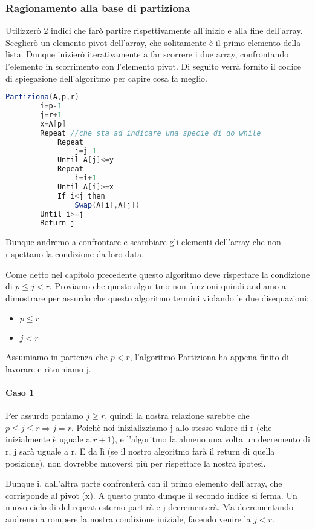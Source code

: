 \subsubsection{Ragionamento alla base di partiziona}
Utilizzerò 2 indici che farò partire rispettivamente all'inizio e alla fine dell'array. Sceglierò un elemento pivot dell'array, che solitamente è il primo elemento della lista. Dunque inizierò iterativamente a far scorrere i due array, confrontando l'elemento in scorrimento con l'elemento pivot. Di seguito verrà fornito il codice di spiegazione dell'algoritmo per capire cosa fa meglio.

\begin{lstlisting}[language=java]
    Partiziona(A,p,r)
        i=p-1
        j=r+1
        x=A[p]
        Repeat //che sta ad indicare una specie di do while
            Repeat
                j=j-1
            Until A[j]<=y
            Repeat
                i=i+1
            Until A[i]>=x
            If i<j then
                Swap(A[i],A[j])
        Until i>=j
        Return j
\end{lstlisting}

Dunque andremo a confrontare e scambiare gli elementi dell'array che non rispettano la condizione da loro data.

Come detto nel capitolo precedente questo algoritmo deve rispettare la condizione di $p\le j < r$. Proviamo che questo algoritmo non funzioni quindi andiamo a dimostrare per assurdo che questo algoritmo termini violando le due disequazioni:
\begin{itemize}
    \item $p\le r$
    \item $j < r$
\end{itemize}

Assumiamo in partenza che $p<r$, l'algoritmo Partiziona ha appena finito di lavorare e ritorniamo j.

\paragraph{Caso 1}
Per assurdo poniamo $j\ge r$, quindi la nostra relazione sarebbe che $p\le j \le r \Rightarrow j=r$. Poichè noi inizializziamo j allo stesso valore di r (che inizialmente è uguale a $r+1$), e l'algoritmo fa almeno una volta un decremento di r, j sarà uguale a r. E da lì (se il nostro algoritmo farà il return di quella posizione), non dovrebbe muoversi più per rispettare la nostra ipotesi.\smallskip

Dunque i, dall'altra parte confronterà con il primo elemento dell'array, che corrisponde al pivot (x). A questo punto dunque il secondo indice si ferma. Un nuovo ciclo di del repeat esterno partirà e j decrementerà. Ma decrementando andremo a rompere la nostra condizione iniziale, facendo venire la $j<r$.

